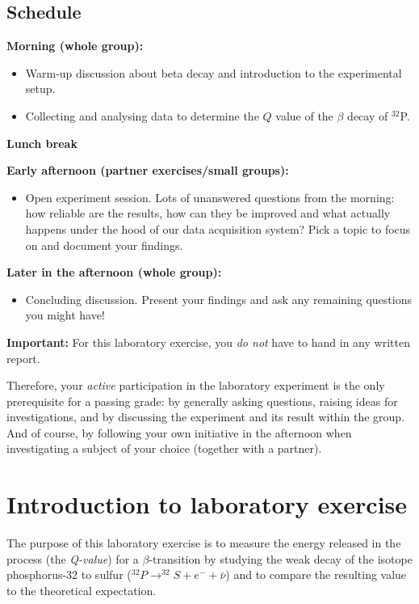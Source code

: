 \documentclass[a4,11pt, notitlepage]{article}
\begin{document}
\subsection{Schedule}

\textbf{Morning (whole group):} 
\begin{itemize}
\item Warm-up discussion about beta decay and introduction to the
  experimental setup.
\item Collecting and analysing data to determine the $Q$ value of the
  $\beta$ decay of $^{32}$P.
\end{itemize}

\textbf{Lunch break} 

\textbf{Early afternoon (partner exercises/small groups):} 
\begin{itemize}
\item Open experiment session. Lots of unanswered questions from the
  morning: how reliable are the results, how can they be improved and
  what actually happens under the hood of our data acquisition system?
  Pick a topic to focus on and document your findings.
\end{itemize}

\textbf{Later in the afternoon (whole group):} 
\begin{itemize}
\item Concluding discussion. Present your findings and ask any
  remaining questions you might have!
\end{itemize}


\textbf{Important: }For this laboratory exercise, you \emph{do not} have to hand in any
written report. 

Therefore, your \emph{active} participation in the laboratory experiment is
the only prerequisite for a passing grade: by generally asking questions,
raising ideas for investigations, and by discussing the experiment and
its result within the group. And of course, by following your own
initiative in the afternoon when investigating a subject of your
choice (together with a partner).

\pagebreak
\section{Introduction to laboratory exercise}

The purpose of this laboratory exercise is to measure the energy
released in the process (the \textit{Q-value}) for a
$\beta$-transition by studying the weak decay of the isotope
phosphorus-32 to sulfur ($^{32}P\rightarrow ^{32}S + e^- + \bar{\nu}$) and to compare the
resulting value to the theoretical expectation. 
\end{document}

